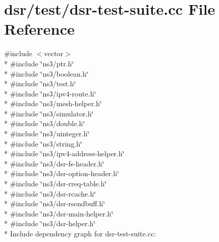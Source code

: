 \hypertarget{dsr-test-suite_8cc}{}\section{dsr/test/dsr-\/test-\/suite.cc File Reference}
\label{dsr-test-suite_8cc}
{\ttfamily \#include $<$vector$>$}\\*
{\ttfamily \#include \char`\"{}ns3/ptr.\+h\char`\"{}}\\*
{\ttfamily \#include \char`\"{}ns3/boolean.\+h\char`\"{}}\\*
{\ttfamily \#include \char`\"{}ns3/test.\+h\char`\"{}}\\*
{\ttfamily \#include \char`\"{}ns3/ipv4-\/route.\+h\char`\"{}}\\*
{\ttfamily \#include \char`\"{}ns3/mesh-\/helper.\+h\char`\"{}}\\*
{\ttfamily \#include \char`\"{}ns3/simulator.\+h\char`\"{}}\\*
{\ttfamily \#include \char`\"{}ns3/double.\+h\char`\"{}}\\*
{\ttfamily \#include \char`\"{}ns3/uinteger.\+h\char`\"{}}\\*
{\ttfamily \#include \char`\"{}ns3/string.\+h\char`\"{}}\\*
{\ttfamily \#include \char`\"{}ns3/ipv4-\/address-\/helper.\+h\char`\"{}}\\*
{\ttfamily \#include \char`\"{}ns3/dsr-\/fs-\/header.\+h\char`\"{}}\\*
{\ttfamily \#include \char`\"{}ns3/dsr-\/option-\/header.\+h\char`\"{}}\\*
{\ttfamily \#include \char`\"{}ns3/dsr-\/rreq-\/table.\+h\char`\"{}}\\*
{\ttfamily \#include \char`\"{}ns3/dsr-\/rcache.\+h\char`\"{}}\\*
{\ttfamily \#include \char`\"{}ns3/dsr-\/rsendbuff.\+h\char`\"{}}\\*
{\ttfamily \#include \char`\"{}ns3/dsr-\/main-\/helper.\+h\char`\"{}}\\*
{\ttfamily \#include \char`\"{}ns3/dsr-\/helper.\+h\char`\"{}}\\*
Include dependency graph for dsr-\/test-\/suite.cc\+:
